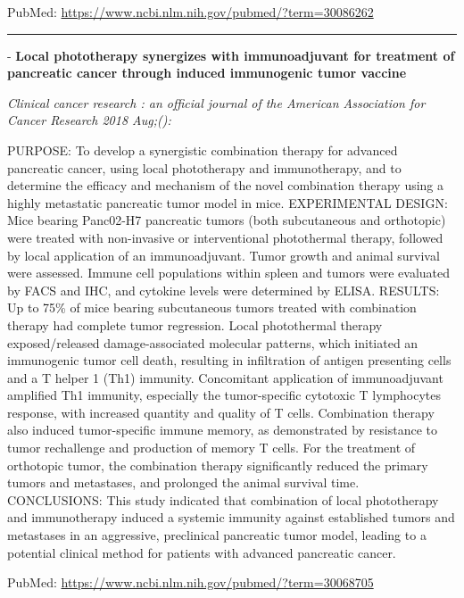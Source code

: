 \documentclass[]{article}
\begin{document}
PubMed: \url{https://www.ncbi.nlm.nih.gov/pubmed/?term=30086262}

{}

{}

\begin{center}\rule{0.5\linewidth}{\linethickness}\end{center}

 - \textbf{Local phototherapy synergizes with immunoadjuvant for
treatment of pancreatic cancer through induced immunogenic tumor
vaccine}

\emph{Clinical cancer research : an official journal of the American
Association for Cancer Research 2018 Aug;():}

PURPOSE: To develop a synergistic combination therapy for advanced
pancreatic cancer, using local phototherapy and immunotherapy, and to
determine the efficacy and mechanism of the novel combination therapy
using a highly metastatic pancreatic tumor model in mice. EXPERIMENTAL
DESIGN: Mice bearing Panc02-H7 pancreatic tumors (both subcutaneous and
orthotopic) were treated with non-invasive or interventional
photothermal therapy, followed by local application of an
immunoadjuvant. Tumor growth and animal survival were assessed. Immune
cell populations within spleen and tumors were evaluated by FACS and
IHC, and cytokine levels were determined by ELISA. RESULTS: Up to 75\%
of mice bearing subcutaneous tumors treated with combination therapy had
complete tumor regression. Local photothermal therapy exposed/released
damage-associated molecular patterns, which initiated an immunogenic
tumor cell death, resulting in infiltration of antigen presenting cells
and a T helper 1 (Th1) immunity. Concomitant application of
immunoadjuvant amplified Th1 immunity, especially the tumor-specific
cytotoxic T lymphocytes response, with increased quantity and quality of
T cells. Combination therapy also induced tumor-specific immune memory,
as demonstrated by resistance to tumor rechallenge and production of
memory T cells. For the treatment of orthotopic tumor, the combination
therapy significantly reduced the primary tumors and metastases, and
prolonged the animal survival time. CONCLUSIONS: This study indicated
that combination of local phototherapy and immunotherapy induced a
systemic immunity against established tumors and metastases in an
aggressive, preclinical pancreatic tumor model, leading to a potential
clinical method for patients with advanced pancreatic cancer.

PubMed: \url{https://www.ncbi.nlm.nih.gov/pubmed/?term=30068705}
\end{document}
